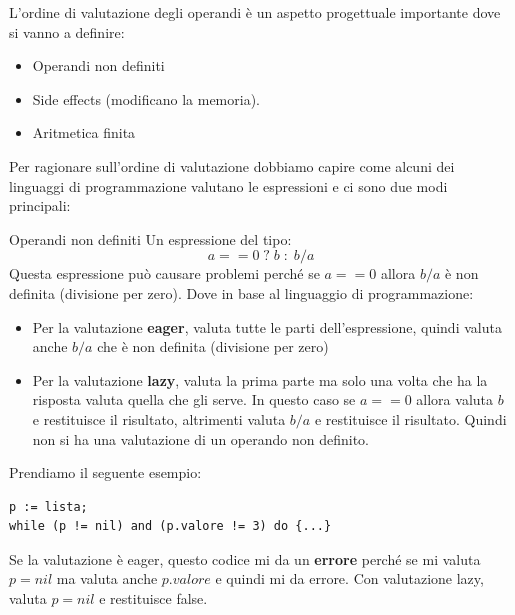 \documentclass[a4paper]{article}
\begin{document}
L'ordine di valutazione degli operandi è un aspetto progettuale importante dove si vanno a definire:
\begin{itemize}
    \item Operandi non definiti 
    \item Side effects (modificano la memoria).
    \item Aritmetica finita
\end{itemize}
Per ragionare sull'ordine di valutazione dobbiamo capire come alcuni dei linguaggi di programmazione
valutano le espressioni e ci sono due modi principali:
\begin{Example}{Operandi non definiti}{}
    Un espressione del tipo:
    \[
        a == 0 \; ? \; b \; :\; b / a
    \]
    Questa espressione può causare problemi perché se \( a == 0 \) allora
     \( b / a \) è non definita (divisione per zero).
    Dove in base al linguaggio di programmazione:
    \begin{itemize}
        \item Per la valutazione \textbf{eager}, valuta tutte le parti dell'espressione, quindi valuta anche \( b / a \) che è non definita
         (divisione per zero)
        \item Per la valutazione \textbf{lazy}, valuta la prima parte ma solo una volta che ha la risposta
        valuta quella che gli serve. In questo caso se \( a == 0 \) allora valuta \( b \) e restituisce 
        il risultato, altrimenti valuta \( b / a \) e restituisce il risultato. Quindi non si ha una valutazione di un operando non definito.
    \end{itemize}
    Prendiamo il seguente esempio:
    \begin{lstlisting}
p := lista;
while (p != nil) and (p.valore != 3) do {...}
\end{lstlisting}
    Se la valutazione è eager, questo codice mi da un \textbf{errore} 
    perché se mi valuta $p = nil$ ma valuta anche $p.valore$ e quindi mi da errore. 
    Con valutazione lazy, valuta $p = nil$ e restituisce false. 
\end{Example}
\end{document}
